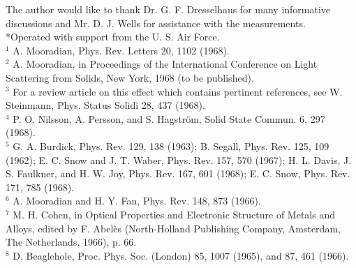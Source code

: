 \documentclass[10pt]{article}
\begin{document}
The author would like to thank Dr. G. F. Dresselhaus for many informative discussions and Mr. D. J. Wells for assistance with the measurements.\\
*Operated with support from the U. S. Air Force.\\
${ }^{1}$ A. Mooradian, Phys. Rev. Letters 20, 1102 (1968).\\
${ }^{2}$ A. Mooradian, in Proceedings of the International Conference on Light Scattering from Solids, New York, 1968 (to be published).\\
${ }^{3}$ For a review article on this effect which contains pertinent references, see W. Steinmann, Phys. Status Solidi 28, 437 (1968).\\
${ }^{4}$ P. O. Nilsson, A. Persson, and S. Hagström, Solid State Commun. 6, 297 (1968).\\
${ }^{5}$ G. A. Burdick, Phys. Rev. 129, 138 (1963); B. Segall, Phys. Rev. 125, 109 (1962); E. C. Snow and J. T. Waber, Phys. Rev. 157, 570 (1967); H. L. Davis, J. S. Faulkner, and H. W. Joy, Phys. Rev. 167, 601 (1968); E. C. Snow, Phys. Rev. 171, 785 (1968).\\
${ }^{6}$ A. Mooradian and H. Y. Fan, Phys. Rev. 148, 873 (1966).\\
${ }^{7}$ M. H. Cohen, in Optical Properties and Electronic Structure of Metals and Alloys, edited by F. Abelès (North-Holland Publishing Company, Amsterdam, The Netherlands, 1966), p. 66.\\
${ }^{8}$ D. Beaglehole, Proc. Phys. Soc. (London) 85, 1007 (1965), and 87, 461 (1966).
\end{document}
